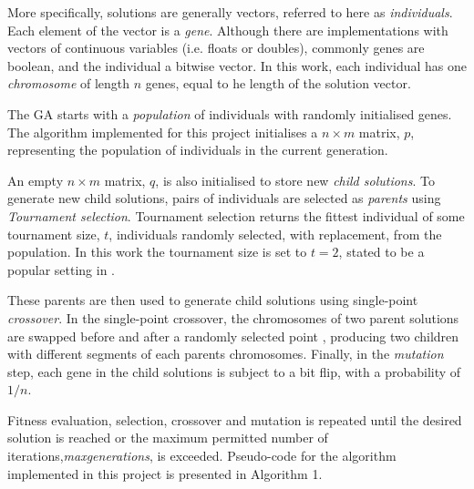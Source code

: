 \documentclass{report}
\begin{document}
More specifically, solutions are generally vectors, referred to here as \emph{individuals}. Each element of the vector is a \emph{gene}. Although there are implementations with vectors of continuous variables (i.e. floats or doubles), commonly genes are boolean, and the individual a bitwise vector. In this work, each individual has one \emph{chromosome} of length \(n\) genes, equal to he length of the solution vector. 

The GA starts with a \emph{population} of individuals with randomly initialised genes. The algorithm implemented for this project initialises a \(n\times m\) matrix, \(p\), representing the population of individuals in the current generation. 

An empty \(n\times m\) matrix, \(q\), is also initialised to store new \emph{child solutions}. To generate new child solutions, pairs of individuals are selected as \emph{parents} using \emph{Tournament selection}. Tournament selection returns the fittest individual of some tournament size, \(t\), individuals randomly selected, with replacement, from the population. In this work the tournament size is set to  \(t=2\), stated to be a popular setting in \cite{Luke2013Metaheuristics}. 

These parents are then used to generate child solutions using  single-point \emph{crossover}. In the single-point crossover, the chromosomes of two parent solutions are swapped before and after a randomly selected point \cite{mirjalili2019genetic}, producing two children with different segments of each parents chromosomes. Finally, in the \emph{mutation} step, each gene in the child solutions is subject to a bit flip, with a probability of \(1/n\). 

Fitness evaluation, selection, crossover and mutation is repeated until the desired solution is reached or the maximum permitted number of iterations,\emph{maxgenerations}, is exceeded.  Pseudo-code for the algorithm implemented in this project is presented in  Algorithm 1. \cbend
\end{document}
